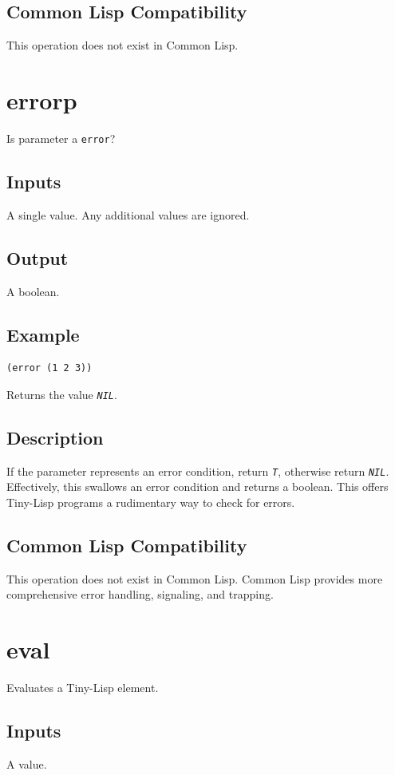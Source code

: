 \documentclass[10pt, openany]{book}
\newcommand{\constant}[1]{\emph{\texttt{#1}}}
\newcommand{\datatype}[1]{\texttt{#1}}
\newcommand{\tl}{Tiny-Lisp}
\newcommand{\cl}{Common Lisp}
\begin{document}
\subsection{Common Lisp Compatibility}
This operation does not exist in \cl.

\section{errorp}
Is parameter a \datatype{error}?
\subsection{Inputs}
A single value.  Any additional values are ignored.
\subsection{Output}
A boolean.
\subsection{Example}
\begin{lstlisting}
(error (1 2 3))
\end{lstlisting}
Returns the value \constant{NIL}.
\subsection{Description}
If the parameter represents an error condition, return \constant{T}, otherwise return \constant{NIL}.  Effectively, this swallows an error condition and returns a boolean.  This offers \tl{} programs a rudimentary way to check for errors.
\subsection{Common Lisp Compatibility}
This operation does not exist in \cl.  \cl{} provides more comprehensive error handling, signaling, and trapping.

\section{eval}
Evaluates a \tl{} element.
\subsection{Inputs}
A value.
\end{document}
